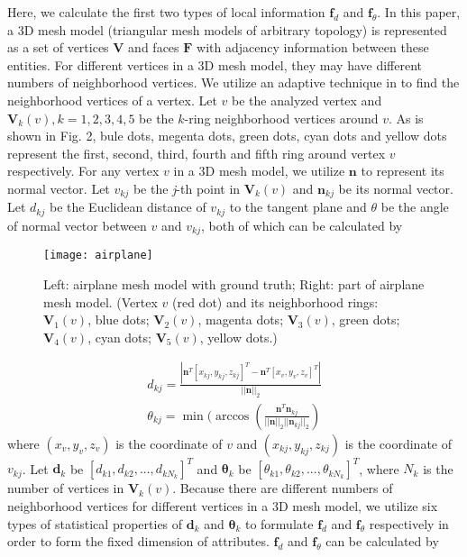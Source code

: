 \documentclass[runningheads]{article}
\begin{document}
Here, we calculate the first two types of local information \emph{$\bm{f}_d$} and \emph{$\bm{f}_\theta$}. In this paper, a 3D mesh model (triangular mesh models of arbitrary topology) is represented as a set of vertices \emph{$\bm{V}$} and faces \emph{$\bm{F}$} with adjacency information between these entities. For different vertices in a 3D mesh model, they may have different numbers of neighborhood vertices. We utilize an adaptive technique in \cite{3Dharris2011harris} to find the neighborhood vertices of a vertex. Let \emph{$v$} be the analyzed vertex and \emph{$\bm{V}_k(v),k=1,2,3,4,5$} be the \emph{$k$}-ring neighborhood vertices around \emph{$v$}. As is shown in Fig. 2, bule dots, megenta dots, green dots, cyan dots and yellow dots represent the first, second, third, fourth and fifth ring around vertex \emph{$v$} respectively.  For any vertex \emph{$v$} in a 3D mesh model, we utilize \emph{$\bm{n}$} to represent its normal vector. Let \emph{$v_{kj}$} be the \emph{j}-th point in \emph{$\bm{V}_k(v)$} and \emph{$\bm{n}_{kj}$} be its normal vector. Let \emph{$d_{kj}$} be the Euclidean distance of \emph{$v_{kj}$} to the tangent plane and \emph{$\theta$} be the angle of normal vector between \emph{$v$} and \emph{$v_{kj}$}, both of which can be calculated by 
\begin{figure}[tbp]
	\centering
	\begin{minipage}[b]{1\linewidth}
		\texttt{[image: airplane]}
		\caption{Left: airplane mesh model with ground truth; Right: part of airplane mesh model. (Vertex \emph{$v$} (red dot) and its neighborhood rings: \emph{$\bm{V}_1(v)$}, blue dots; \emph{$\bm{V}_2(v)$}, magenta dots; \emph{$\bm{V}_3(v)$}, green dots; \emph{$\bm{V}_4(v)$}, cyan dots; \emph{$\bm{V}_5(v)$}, yellow dots.)}
	\end{minipage}
\end{figure}
\begin{gather}
	d_{kj} = \frac{|\bm{n}^T[x_{kj},y_{kj},z_{kj}]^T-\bm{n}^T[x_v,y_v,z_v]^T|}{|| \bm{n} ||_2}\\
	\theta_{kj}= \min(\arccos(\frac{\bm{n}^T\bm{n}_{kj}}{||\bm{n}||_2||\bm{n}_{kj}||_2})
\end{gather} 
where \emph{$(x_v,y_v,z_v)$} is the coordinate of \emph{$v$} and \emph{$(x_{kj},y_{kj},z_{kj})$} is the coordinate of \emph{$v_{kj}$}. Let \emph{$\bm{d}_k$} be \emph{$[d_{k1},d_{k2},...,d_{kN_k}]^T$} and \emph{$\bm{\theta}_k$} be \emph{$[\theta_{k1},\theta_{k2},...,\theta_{kN_k}]^T$}, where \emph{$N_k$} is the number of vertices in \emph{$\bm{V}_k(v)$}. Because there are different numbers of neighborhood vertices for different vertices in a 3D mesh model, we utilize six types of statistical properties of \emph{$\bm{d}_k$} and \emph{$\bm{\theta}_k$} to formulate \emph{$\bm{f}_d$} and \emph{$\bm{f}_\theta$} respectively in order to form the fixed dimension of attributes. \emph{$\bm{f}_d$} and \emph{$\bm{f}_\theta$} can be calculated by
\end{document}
